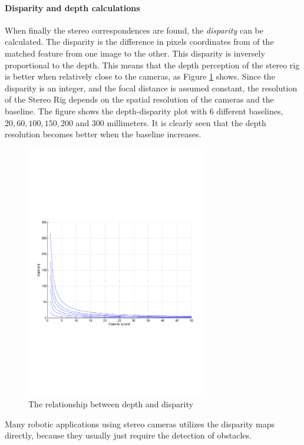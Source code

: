 \paragraph{Disparity and depth calculations}
When finally the stereo correspondences are found, the \emph{disparity} can be calculated.
The disparity is the difference in pixels coordinates from of the matched feature from one
image to the other. This disparity is inversely proportional to the depth. This means that
the depth perception of the stereo rig is better when relatively close to the cameras, as
Figure \ref{chap2:fig-disparity-depth} shows. 
Since the disparity is an integer, and the focal distance is assumed constant, 
the resolution of the Stereo Rig depends on the spatial resolution of the cameras and the 
baseline. The figure shows the depth-disparity plot with 6 different baselines, $20,
60, 100, 150, 200$ and $300$ millimeters. It is clearly seen that the depth resolution becomes better
when the baseline increases. 
\begin{figure}[htbp]
    \centering
    \includegraphics[width=0.7\textwidth]{pics/disparity}
    \caption{The relationship between depth and disparity}
    \label{chap2:fig-disparity-depth}
\end{figure}

Many robotic applications using stereo cameras utilizes the disparity maps directly,
because they usually just require the detection of obstacles. 

